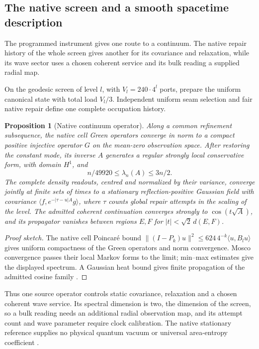 \documentclass[11pt]{article}
\newtheorem{proposition}[theorem]{Proposition}
\theoremstyle{definition}
\theoremstyle{remark}
\begin{document}
\subsection{The native screen and a smooth spacetime description}
\label{sec:continuum}

The programmed instrument gives one route to a continuum. The native
repair history of the whole screen gives another for its covariance and
relaxation, while its wave sector uses a chosen coherent service and its
bulk reading a supplied radial map.

On the geodesic screen of level $l$, with $V_l=240\cdot4^l$ ports, prepare
the uniform canonical state with total load $V_l/3$. Independent uniform
seam selection and fair native repair define one complete occupation
history.

\begin{proposition}[Native continuum operator]
\label{prop:native-continuum}
Along a common refinement subsequence, the native cell Green operators
converge in norm to a compact positive injective operator $G$ on the
mean-zero observation space. After restoring the constant mode, its inverse $A$ generates a regular
strongly local conservative form, with domain $H^1$, and
\[
 n/49920\leq\lambda_n(A)\leq3n/2.
\]
The complete density readouts, centred and normalized by their
variance, converge jointly at finite sets of times to a stationary
reflection-positive Gaussian field with covariance
$\langle f,e^{-|\tau-u|A}g\rangle$, where $\tau$ counts global repair
attempts in the scaling of the level. The admitted coherent continuation
converges strongly to $\cos(t\sqrt A)$, and its propagator vanishes
between regions $E,F$ for $|t|<\sqrt2\,d(E,F)$.
\end{proposition}
\begin{proof}[Proof sketch]
The native cell Poincar\'e bound
$\|(I-P_k)u\|^2\leq624\,4^{-k}\langle u,B_lu\rangle$
gives uniform compactness of the Green operators and norm convergence.
Mosco convergence passes their local Markov forms to the limit; min--max
estimates give the displayed spectrum. A Gaussian heat bound gives finite
propagation of the admitted cosine family
\cite{mosco1994,fukushima2011,coulhon2006,ophcontinuum,ophtimefields}.
\end{proof}

Thus one source operator controls static covariance, relaxation and a
chosen coherent wave service. Its spectral dimension is two, the
dimension of the screen, so a bulk reading needs an additional radial
observation map, and its attempt count and wave parameter require clock
calibration. The native stationary reference supplies no physical quantum
vacuum or universal area-entropy coefficient \cite{ophentropy}.
\end{document}
